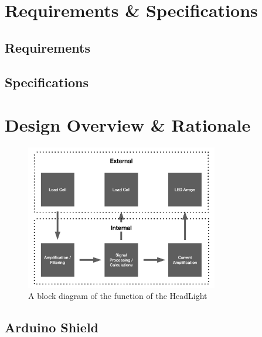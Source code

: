 \documentclass[twoside]{article}
\begin{document}
\section{Requirements \& Specifications}
    \subsection{Requirements}
    \subsection{Specifications}

\section{Design Overview \& Rationale}
    \noindent
    \begin{figure}[H]
        \centering
        \includegraphics[width=0.75\textwidth]{block_diagram.png}
        \caption{A block diagram of the function of the HeadLight}
        \label{fig:block}
    \end{figure}

    \subsection{Arduino Shield}
\end{document}
